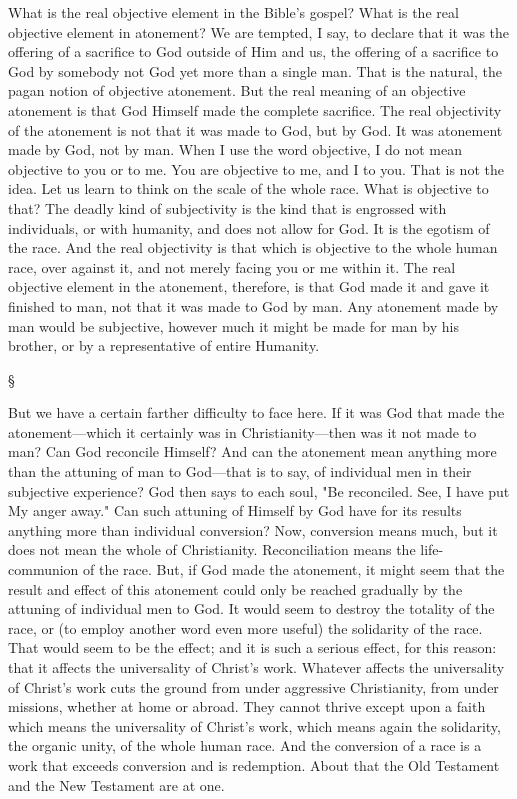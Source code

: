 \documentclass[12pt,letterpaper,oneside]{book}
\begin{document}
What is the real objective element in the 
Bible's gospel? What is the real objective 
element in atonement? We are tempted, I say, 
to declare that it was the offering of a sacrifice 
to God outside of Him and us, the offering of a 
sacrifice to God by somebody not God yet more 
than a single man. That is the natural, the 
pagan notion of objective atonement. But the 
real meaning of an objective atonement is that 
God Himself made the complete sacrifice. The 
real objectivity of the atonement is not that it 
was made to God, but by God. It was atonement 
made by God, not by man. When I use the 
word objective, I do not mean objective to you or 
to me. You are objective to me, and I to you. 
That is not the idea. Let us learn to think on 
the scale of the whole race. What is objective 
to that? The deadly kind of subjectivity is 
the kind that is engrossed with individuals, 
or with humanity, and does not allow for God. 
It is the egotism of the race. And the real objectivity 
is that which is objective to the whole 
human race, over against it, and not merely 
facing you or me within it. The real objective 
element in the atonement, therefore, is that God 
made it and gave it finished to man, not that 
it was made to God by man. Any atonement 
made by man would be subjective, however 
much it might be made for man by his brother, 
or by a representative of entire Humanity. 

\begin{center}
\S
\end{center}
  
But we have a certain farther difficulty to 
face here. If it was God that made the atonement---which 
it certainly was in Christianity---then 
was it not made to man? Can God reconcile 
Himself? And can the atonement mean 
anything more than the attuning of man to 
God---that is to say, of individual men in their 
subjective experience? God then says to each 
soul, "Be reconciled. See, I have put My anger 
away." Can such attuning of Himself by God 
have for its results anything more than individual 
conversion? Now, conversion means 
much, but it does not mean the whole of 
Christianity. Reconciliation means the life-communion 
of the race. But, if God made the 
atonement, it might seem that the result and 
effect of this atonement could only be reached 
gradually by the attuning of individual men to 
God. It would seem to destroy the totality of 
the race, or (to employ another word even 
more useful) the solidarity of the race. That 
would seem to be the effect; and it is such a 
serious effect, for this reason: that it affects 
the universality of Christ's work. Whatever 
affects the universality of Christ's work cuts 
the ground from under aggressive Christianity, 
from under missions, whether at home or 
abroad. They cannot thrive except upon a 
faith which means the universality of Christ's 
work, which means again the solidarity, the 
organic unity, of the whole human race. And 
the conversion of a race is a work that exceeds 
conversion and is redemption. About that the 
Old Testament and the New Testament are 
at one. 
\end{document}
